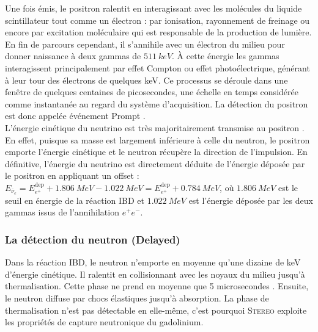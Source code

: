 Une fois émis, le positron ralentit en interagissant avec les molécules du liquide scintillateur tout comme un électron : par ionisation, rayonnement de freinage ou encore par excitation moléculaire qui est responsable de la production de lumière. En fin de parcours cependant, il s'annihile avec un électron du milieu pour donner naissance à deux gammas de $\SI{511}{keV}$. À cette énergie les gammas interagissent principalement par effet Compton ou effet photoélectrique, générant à leur tour des électrons de quelques keV. Ce processus se déroule dans une fenêtre de quelques centaines de picosecondes, une échelle en temps considérée comme instantanée au regard du système d'acquisition. La détection du positron est donc appelée événement \og Prompt \fg{}.\\ 

L'énergie cinétique du neutrino est très majoritairement transmise au positron \cite{Strumia:2003zx}. En effet, puisque sa masse est largement inférieure à celle du neutron, le positron emporte l'énergie cinétique et le neutron récupère la direction de l'impulsion. En définitive, l'énergie du neutrino est directement déduite de l'énergie déposée par le positron en appliquant un offset : $E_{\overline{\nu}_e} = E_{e^+}^{\textrm{dep}} + \SI{1.806}{MeV} - \SI{1.022}{MeV} = E_{e^+}^{\textrm{dep}} + \SI{0.784}{MeV}$, où $\SI{1.806}{MeV}$ est le seuil en énergie de la réaction IBD et $\SI{1.022}{MeV}$ est l'énergie déposée par les deux gammas issus de l'annihilation $e^+e^-$. \\ 


\subsubsection*{La détection du neutron (Delayed)} 

Dans la réaction IBD, le neutron n'emporte en moyenne qu'une dizaine de keV d'énergie cinétique. Il ralentit en collisionnant avec les noyaux du milieu jusqu'à thermalisation. Cette phase ne prend en moyenne que 5 microsecondes \cite{docdb746}. Ensuite, le neutron diffuse par chocs élastiques jusqu'à absorption. La phase de thermalisation n'est pas détectable en elle-même, c'est pourquoi \textsc{Stereo} exploite les propriétés de capture neutronique du gadolinium.\\ 

